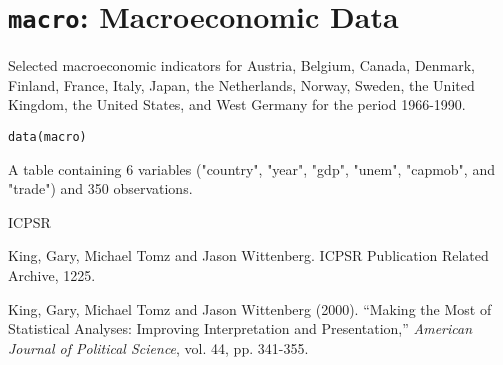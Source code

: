  \section{{\tt macro}: Macroeconomic Data}\label{ss:macro}
\begin{Description}\relax
Selected macroeconomic indicators for Austria, Belgium, Canada,
Denmark, Finland, France, Italy, Japan, the Netherlands, Norway,
Sweden, the United Kingdom, the United States, and West Germany for
the period 1966-1990.
\end{Description}
\begin{Usage}
\begin{verbatim}data(macro)\end{verbatim}
\end{Usage}
\begin{Format}\relax
A table containing 6 variables ("country", "year", "gdp", 
"unem", "capmob", and "trade") and 350 observations.
\end{Format}
\begin{Source}\relax
ICPSR
\end{Source}
\begin{References}\relax
King, Gary, Michael Tomz and Jason Wittenberg. ICPSR Publication
Related Archive, 1225.

King, Gary, Michael Tomz and Jason Wittenberg (2000).
``Making the Most of Statistical Analyses: Improving Interpretation and 
Presentation,'' \emph{American Journal of Political Science}, vol. 44,
pp. 341-355.
\end{References}


